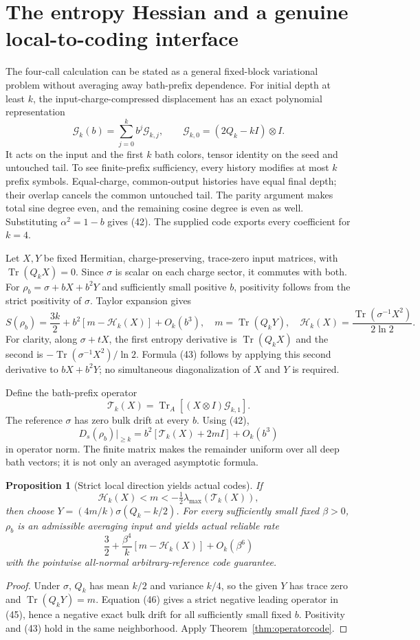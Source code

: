 \documentclass[11pt]{article}
\newtheorem{proposition}[theorem]{Proposition}
\newcommand{\Tr}{\operatorname{Tr}}
\begin{document}
\section{The entropy Hessian and a genuine local-to-coding interface}

The four-call calculation can be stated as a general fixed-block
variational problem without averaging away bath-prefix dependence.
For initial depth at least $k$, the input-charge-compressed displacement
has an exact polynomial representation
\[
 \mathcal G_k(b)=\sum_{j=0}^k b^j\mathcal G_{k,j},\qquad
 \mathcal G_{k,0}=(2Q_k-kI)\otimes I.
 \tag{42}
\]
It acts on the input and the first $k$ bath colors, tensor identity on the
seed and untouched tail. To see finite-prefix sufficiency, every history
modifies at most $k$ prefix symbols. Equal-charge, common-output histories
have equal final depth; their overlap cancels the common untouched tail.
The parity argument makes total sine degree even, and the remaining cosine
degree is even as well. Substituting $\alpha^2=1-b$ gives (42).
The supplied code exports every coefficient for $k=4$.

Let $X,Y$ be fixed Hermitian, charge-preserving, trace-zero input matrices,
with $\Tr(Q_kX)=0$. Since $\sigma$ is scalar on each charge sector,
it commutes with both. For
$\rho_b=\sigma+bX+b^2Y$ and sufficiently small positive $b$, positivity
follows from the strict positivity of $\sigma$. Taylor expansion gives
\[
 S(\rho_b)=\frac{3k}{2}
 +b^2\left[m-\mathcal H_k(X)\right]+O_k(b^3),\quad
 m=\Tr(Q_kY),\quad
 \mathcal H_k(X)=\frac{\Tr(\sigma^{-1}X^2)}{2\ln2}.
 \tag{43}
\]
For clarity, along $\sigma+tX$, the first entropy derivative is
$\Tr(Q_kX)$ and the second is
$-\Tr(\sigma^{-1}X^2)/\ln2$. Formula (43) follows by applying this
second derivative to $bX+b^2Y$; no simultaneous diagonalization of $X$
and $Y$ is required.

Define the bath-prefix operator
\[
 \mathcal T_k(X)=\Tr_A[(X\otimes I)\mathcal G_{k,1}].
 \tag{44}
\]
The reference $\sigma$ has zero bulk drift at every $b$. Using (42),
\[
 D_s(\rho_b)\big|_{\ge k}
 =b^2[\mathcal T_k(X)+2mI]+O_k(b^3)
 \tag{45}
\]
in operator norm. The finite matrix makes the remainder uniform over
all deep bath vectors; it is not only an averaged asymptotic formula.

\begin{proposition}[Strict local direction yields actual codes]\label{prop:local}
If
\[
 \mathcal H_k(X)<m<-\tfrac12\lambda_{\max}(\mathcal T_k(X)),
 \tag{46}
\]
then choose
$Y=(4m/k)\sigma(Q_k-k/2)$.
For every sufficiently small fixed $\beta>0$,
$\rho_b$ is an admissible averaging input and yields actual reliable rate
\[
 \frac32+\frac{\beta^4}{k}
 [m-\mathcal H_k(X)]+O_k(\beta^6)
 \tag{47}
\]
with the pointwise all-normal arbitrary-reference code guarantee.
\end{proposition}
\begin{proof}
Under $\sigma$, $Q_k$ has mean $k/2$ and variance $k/4$, so the given
$Y$ has trace zero and $\Tr(Q_kY)=m$. Equation (46) gives a strict
negative leading operator in (45), hence a negative exact bulk drift for
all sufficiently small fixed $b$. Positivity and (43) hold in the same
neighborhood. Apply Theorem~\ref{thm:operatorcode}.
\end{proof}
\end{document}
